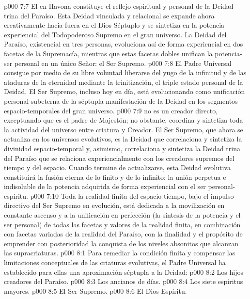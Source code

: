 \vs p000 7:7 \pc El  en Havona constituye el reflejo espiritual y personal de la Deidad trina del Paraíso. Esta Deidad vinculada y relacional se expande ahora creativamente hacia fuera en el Dios Séptuplo y se sintetiza en la potencia experiencial del Todopoderoso Supremo en el gran universo. La Deidad del Paraíso, existencial en tres personas, evoluciona así de forma experiencial en dos facetas de la Supremacía, mientras que estas facetas dobles unifican la potencia\hyp{}ser personal en un único Señor: el Ser Supremo.
\vs p000 7:8 El Padre Universal consigue por medio de su libre voluntad liberarse del yugo de la infinitud y de las ataduras de la eternidad mediante la trinitización, el triple estado personal de la Deidad. El Ser Supremo, incluso hoy en día, está evolucionando como unificación personal subeterna de la séptupla manifestación de la Deidad en los segmentos espacio\hyp{}temporales del gran universo.
\vs p000 7:9 \pc {} no es un creador directo, exceptuando que es el padre de Majestón; no obstante, coordina y sintetiza toda la actividad del universo entre criatura y Creador. El Ser Supremo, que ahora se actualiza en los universos evolutivos, es la Deidad que correlaciona y sintetiza la divinidad espacio\hyp{}temporal y, asimismo, correlaciona y sintetiza la Deidad trina del Paraíso que se relaciona experiencialmente con los creadores supremos del tiempo y del espacio. Cuando termine de actualizarse, esta Deidad evolutiva constituirá la fusión eterna de lo finito y de lo infinito: la unión perpetua e indisoluble de la potencia adquirida de forma experiencial con el ser personal\hyp{}espíritu.
\vs p000 7:10 Toda la realidad finita del espacio\hyp{}tiempo, bajo el impulso directivo del Ser Supremo en evolución, está dedicada a la movilización en constante ascenso y a la unificación en perfección (la síntesis de la potencia y el ser personal) de todas las facetas y valores de la realidad finita, en combinación con facetas variadas de la realidad del Paraíso, con la finalidad y el propósito de emprender con posterioridad la conquista de los niveles absonitos que alcanzan las supracriaturas.
\vs p000 8:1 Para remediar la condición finita y compensar las limitaciones conceptuales de las criaturas evolutivas, el Padre Universal ha establecido para ellas una aproximación séptupla a la Deidad:
\vs p000 8:2 Los hijos creadores del Paraíso.
\vs p000 8:3 Los ancianos de días.
\vs p000 8:4 Los siete espíritus mayores.
\vs p000 8:5 El Ser Supremo.
\vs p000 8:6 El Dios Espíritu.
